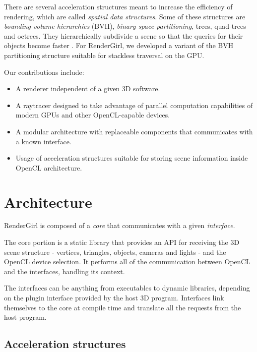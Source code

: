 \documentclass[a0,portrait]{a0poster}
\begin{document}
\begin{multicols}{2}
There are several acceleration structures meant to increase the
efficiency of rendering, which are called \emph{spatial data
  structures}. Some of these structures are \emph{bounding volume
  hierarchies} (BVH), \emph{binary space partitioning}, trees,
quad-trees and octrees. They hierarchically subdivide a scene so that
the queries for their objects become faster
\cite[Chapter~14.1]{akenine-moller:2008}. For RenderGirl, we developed
a variant of the BVH partitioning structure suitable for stackless
traversal on the GPU.

Our contributions include:

\begin{itemize}
  \item A renderer independent of a given 3D software.
  \item A raytracer designed to take advantage of parallel
    computation capabilities of modern GPUs and other OpenCL-capable
    devices.
  \item A modular architecture with replaceable components that
    communicates with a known interface.
  \item Usage of acceleration structures suitable for storing scene
    information inside OpenCL architecture.
\end{itemize}


\section*{Architecture}

RenderGirl is composed of a \emph{core} that communicates with a given
\emph{interface}.

The core portion is a static library that provides an API for
receiving the 3D scene structure - vertices, triangles, objects,
cameras and lights - and the OpenCL device selection. It performs all
of the communication between OpenCL and the interfaces, handling its
context.

The interfaces can be anything from executables to dynamic libraries,
depending on the plugin interface provided by the host 3D
program. Interfaces link themselves to the core at compile time and
translate all the requests from the host program.

\subsection*{Acceleration structures}


\end{multicols}
\end{document}
